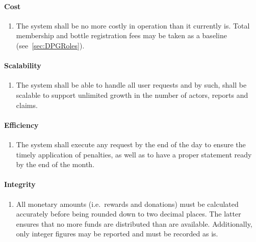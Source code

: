 \paragraph{Cost}
\begin{enumerate}[resume, font=\sffamily, label={\textbf{NFR-\protect\twodigits{\theenumi}}},leftmargin=1.7cm, ref=NFR-\protect\twodigits{\theenumi}]  
	\item The system shall be no more costly in operation than it currently is. Total membership and bottle registration fees may be taken as a baseline (see~\ref{sec:DPGRoles}).\label{itm:operatingCost}
\end{enumerate}

\paragraph{Scalability}
\begin{enumerate}[resume, font=\sffamily, label={\textbf{NFR-\protect\twodigits{\theenumi}}},leftmargin=1.7cm, ref=NFR-\protect\twodigits{\theenumi}]  
	\item The system shall be able to handle all user requests and by such, shall be scalable to support unlimited growth in the number of actors, reports and claims.\label{itm:unlimitedGrowth}
\end{enumerate}

\paragraph{Efficiency}
\begin{enumerate}[resume, font=\sffamily, label={\textbf{NFR-\protect\twodigits{\theenumi}}},leftmargin=1.7cm, ref=NFR-\protect\twodigits{\theenumi}]  
	\item The system shall execute any request by the end of the day to ensure the timely application of penalties, as well as to have a proper statement ready by the end of the month.\label{itm:responseTime}
\end{enumerate}

\paragraph{Integrity}
\begin{enumerate}[resume, font=\sffamily, label={\textbf{NFR-\protect\twodigits{\theenumi}}},leftmargin=1.7cm, ref=NFR-\protect\twodigits{\theenumi}]  
	\item All monetary amounts (i.e.~rewards and donations) must be calculated accurately before being rounded down to two decimal places. The latter ensures that no more funds are distributed than are available. Additionally, only integer figures may be reported and must be recorded as is.\label{itm:calculcations}
\end{enumerate}

